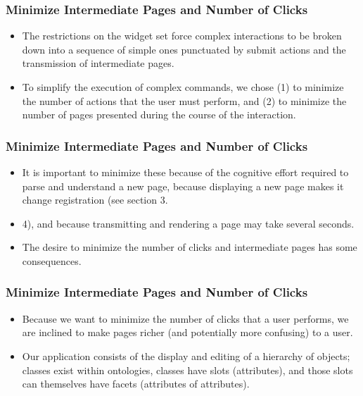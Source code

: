 \documentclass{beamer}
\begin{document}
\begin{frame}
\frametitle{Minimize Intermediate Pages and Number of Clicks}

\begin{itemize}
\item The restrictions on the widget set force complex interactions to be broken down into a sequence of simple ones punctuated by submit actions and the transmission of intermediate pages.
\item To simplify the execution of complex commands, we chose (1) to minimize the number of actions that the user must perform, and (2) to minimize the number of pages presented during the course of the interaction.
\end{itemize}

\end{frame}

\begin{frame}
\frametitle{Minimize Intermediate Pages and Number of Clicks}

\begin{itemize}
\item It is important to minimize these because of the cognitive effort required to parse and understand a new page, because displaying a new page makes it change registration (see section 3.
\item 4), and because transmitting and rendering a page may take several seconds.
\item The desire to minimize the number of clicks and intermediate pages has some consequences.
\end{itemize}

\end{frame}

\begin{frame}
\frametitle{Minimize Intermediate Pages and Number of Clicks}

\begin{itemize}
\item Because we want to minimize the number of clicks that a user performs, we are inclined to make pages richer (and potentially more confusing) to a user.
\item Our application consists of the display and editing of a hierarchy of objects; classes exist within ontologies, classes have slots (attributes), and those slots can themselves have facets (attributes of attributes).
\end{itemize}

\end{frame}
\end{document}
